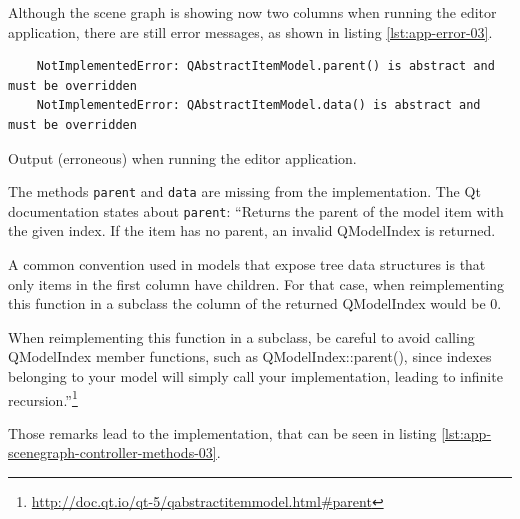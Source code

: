 \documentclass[10pt, openright, notitlepage]{scrreprt}
\begin{document}
Although the scene graph is showing now two columns when running the editor
application, there are still error messages, as shown in listing \ref{lst:app-error-03}.

\begin{listing}[H]
\begin{verbatim}
    NotImplementedError: QAbstractItemModel.parent() is abstract and must be overridden
    NotImplementedError: QAbstractItemModel.data() is abstract and must be overridden
\end{verbatim}
\caption{\label{lst:app-error-03}
Output (erroneous) when running the editor application.}
\end{listing}

The methods \texttt{parent} and \texttt{data} are missing from the
implementation. The Qt documentation states about \texttt{parent}:
``Returns the parent of the model item with the given index. If the item has no
parent, an invalid QModelIndex is returned.

A common convention used in models that expose tree data structures is that only
items in the first column have children. For that case, when reimplementing this
function in a subclass the column of the returned QModelIndex would be 0.

When reimplementing this function in a subclass, be careful to avoid calling
QModelIndex member functions, such as QModelIndex::parent(), since indexes
belonging to your model will simply call your implementation, leading to
infinite
recursion.''\footnote{\url{http://doc.qt.io/qt-5/qabstractitemmodel.html\#parent}}

Those remarks lead to the implementation, that can be seen in listing
\ref{lst:app-scenegraph-controller-methods-03}.
\end{document}

